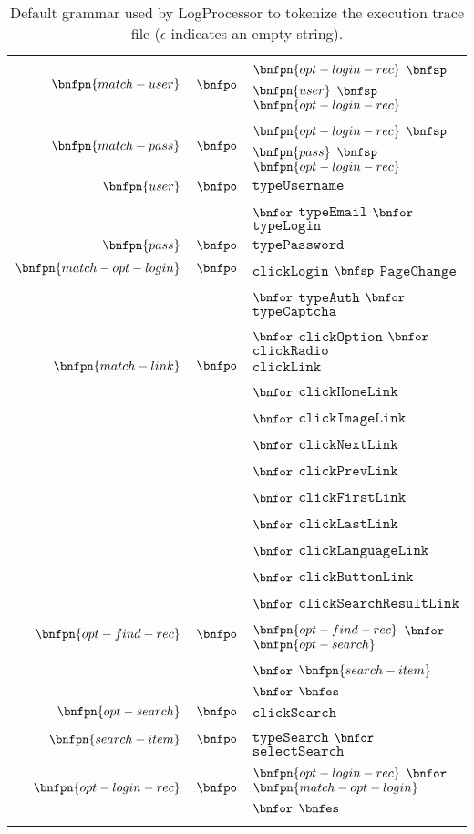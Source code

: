 \begin{table}[!htb]
\begin{tabular}{rcl}
  $\bnfpn{match-user}$ & $\bnfpo$ &  $\bnfpn{opt-login-rec}$ $\bnfsp$ $\bnfpn{user}$ $\bnfsp$ $\bnfpn{opt-login-rec}$ \\
  
  $\bnfpn{match-pass}$ & $\bnfpo$ &  $\bnfpn{opt-login-rec}$ $\bnfsp$ $\bnfpn{pass}$ $\bnfsp$ $\bnfpn{opt-login-rec}$ \\
  
  $\bnfpn{user}$ & $\bnfpo$ &  $\texttt{typeUsername}$ \\
  & & $\bnfor$ $\texttt{typeEmail}$ $\bnfor$ $\texttt{typeLogin}$ \\
  
  $\bnfpn{pass}$ & $\bnfpo$ &  $\texttt{typePassword}$ \\
  
  $\bnfpn{match-opt-login}$ & $\bnfpo$ &  $\texttt{clickLogin}$ $\bnfsp$ $\texttt{PageChange}$ \\
  & & $\bnfor$ $\texttt{typeAuth}$ $\bnfor$ $\texttt{typeCaptcha}$ \\
  & & $\bnfor$ $\texttt{clickOption}$ $\bnfor$ $\texttt{clickRadio}$ \\
  
  $\bnfpn{match-link}$ & $\bnfpo$ &  $\texttt{clickLink}$ \\
   & & $\bnfor$ $\texttt{clickHomeLink}$ \\
   & & $\bnfor$ $\texttt{clickImageLink}$ \\
   & & $\bnfor$ $\texttt{clickNextLink}$ \\
   & & $\bnfor$ $\texttt{clickPrevLink}$ \\
   & & $\bnfor$ $\texttt{clickFirstLink}$ \\
   & & $\bnfor$ $\texttt{clickLastLink}$ \\
   & & $\bnfor$ $\texttt{clickLanguageLink}$ \\
   & & $\bnfor$ $\texttt{clickButtonLink}$ \\
   & & $\bnfor$ $\texttt{clickSearchResultLink}$ \\
  
  $\bnfpn{opt-find-rec}$ & $\bnfpo$ &  $\bnfpn{opt-find-rec}$ $\bnfor$ $\bnfpn{opt-search}$ \\
  & & $\bnfor$ $\bnfpn{search-item}$ $\bnfor$ $\bnfes$ \\
  
  $\bnfpn{opt-search}$ & $\bnfpo$ &  $\texttt{clickSearch}$ \\
  
  $\bnfpn{search-item}$ & $\bnfpo$ &  $\texttt{typeSearch}$ $\bnfor$ $\texttt{selectSearch}$ \\
  
  $\bnfpn{opt-login-rec}$ & $\bnfpo$ &  $\bnfpn{opt-login-rec}$ $\bnfor$ $\bnfpn{match-opt-login}$ $\bnfor$ $\bnfes$ \\
  & & \\
  \end{tabular}
\caption{Default grammar used by LogProcessor to tokenize the execution trace file ($\epsilon$ indicates an empty string).}
\label{tab:grammar}
\end{table}

